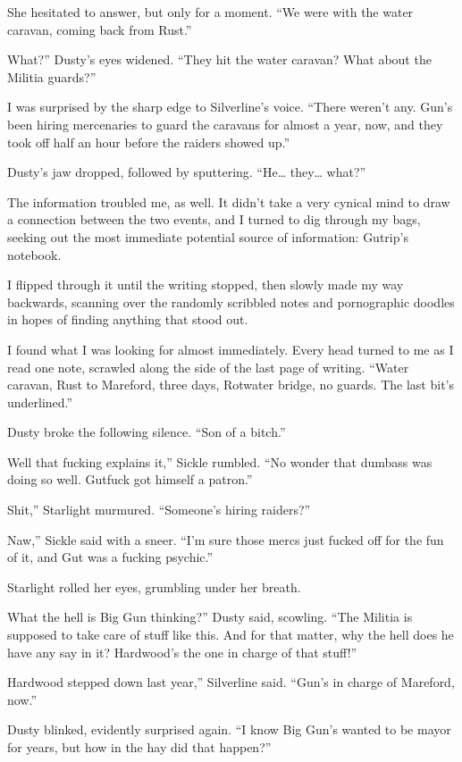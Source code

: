 She hesitated to answer, but only for a moment. “We were with the water caravan, coming back from Rust.”

\leavevmode{}What?” Dusty’s eyes widened. “They hit the water caravan? What about the Militia guards?”

I was surprised by the sharp edge to Silverline’s voice. “There weren’t any. Gun’s been hiring mercenaries to guard the caravans for almost a year, now, and they took off half an hour before the raiders showed up.”

Dusty’s jaw dropped, followed by sputtering. “He… they… what?”

The information troubled me, as well. It didn’t take a very cynical mind to draw a connection between the two events, and I turned to dig through my bags, seeking out the most immediate potential source of information: Gutrip’s notebook.

I flipped through it until the writing stopped, then slowly made my way backwards, scanning over the randomly scribbled notes and pornographic doodles in hopes of finding anything that stood out.

I found what I was looking for almost immediately. Every head turned to me as I read one note, scrawled along the side of the last page of writing. “Water caravan, Rust to Mareford, three days, Rotwater bridge, no guards. The last bit’s underlined.”

Dusty broke the following silence. “Son of a bitch.”

\leavevmode{}Well that fucking explains it,” Sickle rumbled. “No wonder that dumbass was doing so well. Gutfuck got himself a patron.”

\leavevmode{}Shit,” Starlight murmured. “Someone’s hiring raiders?”

\leavevmode{}Naw,” Sickle said with a sneer. “I’m sure those mercs just fucked off for the fun of it, and Gut was a fucking psychic.”

Starlight rolled her eyes, grumbling under her breath.

\leavevmode{}What the hell is Big Gun thinking?” Dusty said, scowling. “The Militia is supposed to take care of stuff like this. And for that matter, why the hell does he have any say in it? Hardwood’s the one in charge of that stuff!”

\leavevmode{}Hardwood stepped down last year,” Silverline said. “Gun’s in charge of Mareford, now.”

Dusty blinked, evidently surprised again. “I know Big Gun’s wanted to be mayor for years, but how in the hay did that happen?”

